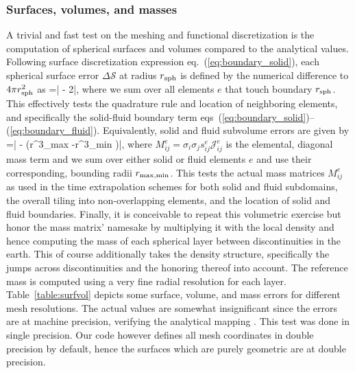 \subsubsection{Surfaces, volumes, and masses}
%
A trivial and fast test on the meshing and functional discretization 
is the computation of spherical surfaces and volumes compared to the analytical 
values. Following surface discretization expression eq.~(\ref{eq:boundary_solid}),
each spherical surface error $\Delta {\mathcal S}$ at radius 
$r_{\rm sph}$ is defined by the numerical difference to $4\pi r_{\rm sph}^2$ as
%
\eq
{}=\left| -
2\right|,
\en
%
where we sum over all elements $e$ that touch boundary $r_{\rm sph}$. 
This effectively tests the quadrature rule and location of neighboring elements, 
and specifically the solid-fluid boundary term 
eqs~(\ref{eq:boundary_solid})--(\ref{eq:boundary_fluid}).
%
Equivalently, solid and fluid subvolume errors are given by
%
\eq
{}=\left| - 
\left(r^3_{\rm max} -r^3_{\rm min} \right)\right|,
\en
%
where $M_{ij}^e=\sigma_i\sigma_j s_{ij}^e {\mathcal J}_{ij}^e $ is the elemental, 
diagonal mass term and we sum over either solid or fluid elements $e$ and use their 
corresponding, bounding radii $r_{\rm max,min}$. This tests the actual mass 
matrices $M_{ij}^e$ as used in the time extrapolation schemes 
for both solid and fluid subdomains, the overall tiling into non-overlapping 
elements, and the location of solid and fluid boundaries. 
Finally, it is conceivable to repeat this volumetric exercise but honor the mass 
matrix' namesake by multiplying it with the local density and hence computing 
the mass of each spherical layer between discontinuities in the earth. 
This of course additionally takes the density structure, specifically the jumps 
across discontinuities and the honoring thereof into account. 
The reference mass is computed using a very fine radial resolution for each 
layer. Table~\ref{table:surfvol}
depicts some surface, volume, and mass errors for different mesh resolutions.
The actual values are somewhat insignificant since the errors are at machine 
precision, verifying the analytical mapping \citep[][Appendix~A]{nissen+:07b}. 
This test was done in single precision. Our code however defines all 
mesh coordinates in double precision by default, hence the surfaces which are 
purely geometric are at double precision.
%
